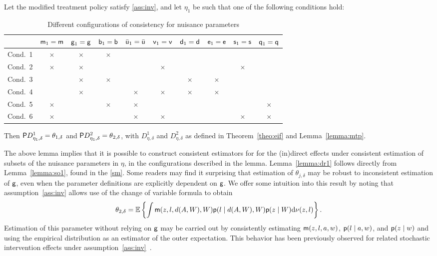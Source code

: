 \begin{lemma}\label{lemma:dr1}
  Let the modified treatment policy satisfy \ref{ass:inv}, and let $\eta_1$ be
  such that one of the following conditions hold:
  \begin{table}[H]
    \centering
    \begin{tabular}{|c|c|c|c|c|c|c|c|c|c|}\hline
              & $\m_1=\m$ & $\g_1=\g$ & $\b_1=\b$ & $\bar\uu_1=\bar\uu$ & $\vv_1=\vv$ & $\d_1=\d$ & $\e_1=\e$ & $\s_1=\s$ & $\q_1=\q$ \\\hline
      Cond.~1 & $\times$  & $\times$  & $\times$  &                     &             &           &           &           &           \\
      Cond.~2 & $\times$  & $\times$  &           &                     & $\times$    &           &           & $\times$  &           \\
      Cond.~3 &           & $\times$  & $\times$  &                     &             & $\times$  & $\times$  &           &           \\
      Cond.~4 &           & $\times$  &           & $\times$            & $\times$    & $\times$  & $\times$  &           &           \\
      Cond.~5 & $\times$  &           & $\times$  & $\times$            &             &           &           &           & $\times$  \\
      Cond.~6 & $\times$  &           &           & $\times$            & $\times$    &           &           & $\times$  & $\times$  \\\hline
    \end{tabular}
    \caption{Different configurations of consistency for nuisance
      parameters}
    \label{tab:dr1}
  \end{table}
  Then $\P D_{\eta_1,\delta}^1=\theta_{1,\delta}$ and $\P
  D_{\eta_1,\delta}^2=\theta_{2,\delta}$, with $D_{\eta,\delta}^1$ and
  $D_{\eta,\delta}^2$ as defined in Theorem~\ref{theo:eif} and
  Lemma~\ref{lemma:mtp}.
\end{lemma}
The above lemma implies that it is possible to construct consistent estimators
for for the (in)direct effects under consistent estimation of subsets of the
nuisance parameters in $\eta$, in the configurations described in the lemma.
Lemma~\ref{lemma:dr1} follows directly from Lemma~\ref{lemma:so1}, found in
the \ref{sm}. Some readers may find it surprising that estimation of
$\theta_{j,\delta}$ may be robust to inconsistent estimation of $\g$, even when
the parameter definitions are explicitly dependent on $\g$. We offer some
intuition into this result by noting that assumption~\ref{ass:inv} allows use of
the change of variable formula to obtain $$\theta_{2,\delta} = \E\left\{\int
\m(z, l, d(A,W),W)\p(l\mid d(A,W), W)\p(z \mid W)\dd\nu(z,l)\right\}.$$
Estimation of this parameter without relying on $\g$ may be carried out by
consistently estimating $\m(z,l,a,w)$, $\p(l\mid a, w)$, and $\p(z\mid w)$ and
using the empirical distribution as an estimator of the outer expectation. This
behavior has been previously observed for related stochastic intervention
effects under assumption~\ref{ass:inv}~\citep{diaz2012population,
haneuse2013estimation, diaz2020causal}.

